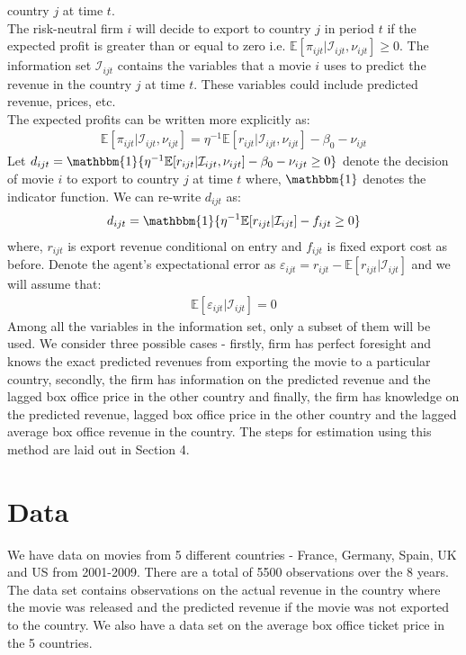 \documentclass[11pt, letterpaper]{article} \usepackage{amsmath}
\begin{document}
country $j$ at time $t$.\\
The risk-neutral firm $i$ will decide to export to country $j$ in
period $t$ if the expected profit is greater than or equal to zero
i.e. $\mathbb{E}[\pi_{ijt} | \mathcal{I}_{ijt}, \nu_{ijt}] \geq 0$.
The information set $\mathcal{I}_{ijt}$ contains the variables that a
movie $i$ uses to predict the revenue in the country $j$ at time
$t$. These variables could include predicted revenue, prices, etc.\\
The expected profits can be written more explicitly as:
\begin{align*}
  \mathbb{E}[\pi_{ijt}|\mathcal{I}_{ijt}, \nu_{ijt}] = \eta^{-1}
  \mathbb{E}[r_{ijt} | \mathcal{I}_{ijt}, \nu_{ijt}] - \beta_0 - \nu_{ijt}
\end{align*}
Let
$d_{ijt} = \mathbbm{1}\{\eta^{-1}\mathbb{E}[r_{ijt} |
\mathcal{I}_{ijt}, \nu_{ijt}] - \beta_0 - \nu_{ijt} \geq 0\}$
denote the decision of movie $i$ to export to country $j$ at time $t$
where, $\mathbbm{1}$ denotes the indicator function. We can re-write
$d_{ijt}$ as:
\begin{align*}
  d_{ijt} = \mathbbm{1}\{\eta^{-1} \mathbb{E}[r_{ijt} |
  \mathcal{I}_{ijt}] - f_{ijt} \geq 0\}
\end{align*}
where, $r_{ijt}$ is export revenue conditional on entry and $f_{ijt}$
is fixed export cost as before. Denote the agent's expectational error
as
$\varepsilon_{ijt} = r_{ijt} - \mathbb{E}[r_{ijt} |
\mathcal{I}_{ijt}]$ and we will assume that:
\begin{align*}
  \mathbb{E}[\varepsilon_{ijt} | \mathcal{I}_{ijt}] = 0
\end{align*}
Among all the variables in the information set, only a subset of them
will be used. We consider three possible cases - firstly, firm has
perfect foresight and knows the exact predicted revenues from
exporting the movie to a particular country, secondly, the firm has
information on the predicted revenue and the lagged box office price
in the other country and finally, the firm has knowledge on the
predicted revenue, lagged box office price in the other country and
the lagged average box office revenue in the country. The steps for
estimation using this method are laid out in Section 4.
\section{Data}
We have data on movies from 5 different countries - France, Germany,
Spain, UK and US from 2001-2009. There are a total of 5500
observations over the 8 years. The data set contains observations on
the actual revenue in the country where the movie was released and the
predicted revenue if the movie was not exported to the country. We
also have a data set on the average box office ticket price in the 5
countries.
\end{document}
